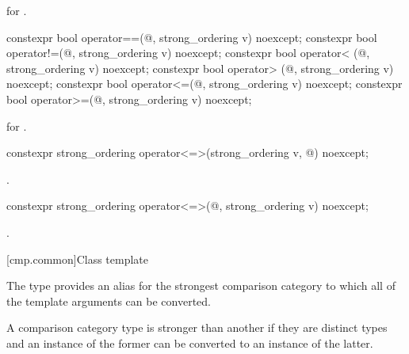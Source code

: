 \begin{itemdescr}
\pnum
\returns
{} for .
\end{itemdescr}

%
%
%
%
%
%
\begin{itemdecl}
constexpr bool operator==(@\unspec@, strong_ordering v) noexcept;
constexpr bool operator!=(@\unspec@, strong_ordering v) noexcept;
constexpr bool operator< (@\unspec@, strong_ordering v) noexcept;
constexpr bool operator> (@\unspec@, strong_ordering v) noexcept;
constexpr bool operator<=(@\unspec@, strong_ordering v) noexcept;
constexpr bool operator>=(@\unspec@, strong_ordering v) noexcept;
\end{itemdecl}

\begin{itemdescr}
\pnum
\returns
{} for .
\end{itemdescr}

%
\begin{itemdecl}
constexpr strong_ordering operator<=>(strong_ordering v, @\unspec@) noexcept;
\end{itemdecl}

\begin{itemdescr}
\pnum
\returns
{}.
\end{itemdescr}

%
\begin{itemdecl}
constexpr strong_ordering operator<=>(@\unspec@, strong_ordering v) noexcept;
\end{itemdecl}

\begin{itemdescr}
\pnum
\returns
{}.
\end{itemdescr}

[cmp.common]{Class template }

\pnum
The type  provides an alias for
the strongest comparison category
to which all of the template arguments can be converted.
\begin{note}
A comparison category type is stronger than another if
they are distinct types and an instance of the former
can be converted to an instance of the latter.
\end{note}

